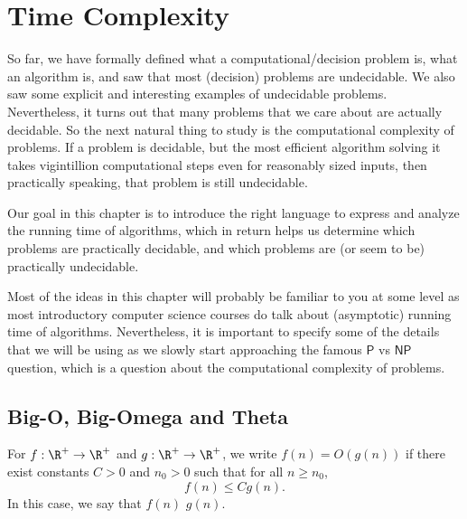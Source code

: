 \chapter{Time Complexity}
\label{chapter:time-complexity}

\begin{preamble}
\label{prmbl:time-complexity::formally}
So far, we have formally defined what a computational/decision problem is, what an algorithm is, and saw that most (decision) problems are undecidable. We also saw some explicit and interesting examples of undecidable problems. Nevertheless, it turns out that many problems that we care about are actually decidable. So the next natural thing to study is the computational complexity of problems. If a problem is decidable, but the most efficient algorithm solving it takes vigintillion computational steps even for reasonably sized inputs, then practically speaking, that problem is still undecidable.

Our goal in this chapter is to introduce the right language to express and analyze the running time of algorithms, which in return helps us determine which problems are practically decidable, and which problems are (or seem to be) practically undecidable.

Most of the ideas in this chapter will probably be familiar to you at some level as most introductory computer science courses do talk about (asymptotic) running time of algorithms. Nevertheless, it is important to specify some of the details that we will be using as we slowly start approaching the famous $\mathsf{P}$ vs $\mathsf{NP}$ question, which is a question about the computational complexity of problems.

\end{preamble}


\section{Big-O, Big-Omega and Theta}
\label{sec:time-complexity::big-o-big-omega-and-theta}

\begin{definition}[Big-O]
\label{definition:Big-O}
For $f: \R^+ \to \R^+$ and $g: \R^+ \to \R^+$, we write $f(n) = O(g(n))$ if there exist constants $C > 0$ and $n_0 > 0$ such that for all $n \geq n_0$,
\[
f(n) \leq Cg(n).
\]
In this case, we say that $f(n)$  $g(n)$.

\end{definition}


